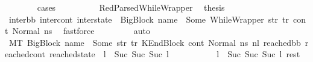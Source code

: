 \begin{isabellebody}
\ \ \ \ \ \ \isamarkupfalse%
\ cases\isanewline
\ \ \ \ \ \ \ \ \isamarkupfalse%
\ RedParsedWhileWrapper\ \isamarkupfalse%
\ {\isacharquery}{\kern0pt}thesis\ \isamarkupfalse%
\ {\isacartoucheopen}{\isacharparenleft}{\kern0pt}inter{\isacharunderscore}{\kern0pt}bb{}{\isacharcomma}{\kern0pt}\ inter{\isacharunderscore}{\kern0pt}cont{}{\isacharcomma}{\kern0pt}\ inter{\isacharunderscore}{\kern0pt}state{}{\isacharparenright}{\kern0pt}\ {\isacharequal}{\kern0pt}\ {\isacharparenleft}{\kern0pt}BigBlock\ name\ {\isacharbrackleft}{\kern0pt}{\isacharbrackright}{\kern0pt}\ {\isacharparenleft}{\kern0pt}Some\ {\isacharparenleft}{\kern0pt}WhileWrapper\ str{\isacharparenright}{\kern0pt}{\isacharparenright}{\kern0pt}\ tr{\isacharcomma}{\kern0pt}\ cont{}{\isacharcomma}{\kern0pt}\ Normal\ ns{}{\isacharparenright}{\kern0pt}{\isacartoucheclose}\ \isamarkupfalse%
\ fastforce\ \isanewline
\ \ \ \ \ \ \isamarkupfalse%
\ auto\isanewline
\ \ \ \ \ \ \isamarkupfalse%
\ {\isachardoublequoteopen}{\isacharparenleft}{\kern0pt}M{\isacharcomma}{\kern0pt}{\isasymLambda}{\isacharcomma}{\kern0pt}{\isasymGamma}{\isacharcomma}{\kern0pt}{\isasymOmega}{\isacharcomma}{\kern0pt}T\ {\isasymturnstile}{\isacharparenleft}{\kern0pt}{\isacharparenleft}{\kern0pt}BigBlock\ name\ {\isacharbrackleft}{\kern0pt}{\isacharbrackright}{\kern0pt}\ {\isacharparenleft}{\kern0pt}Some\ str{\isacharparenright}{\kern0pt}\ tr{\isacharparenright}{\kern0pt}{\isacharcomma}{\kern0pt}\ KEndBlock\ cont{}{\isacharcomma}{\kern0pt}\ Normal\ ns{}{\isacharparenright}{\kern0pt}\ {\isacharminus}{\kern0pt}n{\isasymlongrightarrow}{\isacharcircum}{\kern0pt}l{}\ {\isacharparenleft}{\kern0pt}reached{\isacharunderscore}{\kern0pt}bb{\isacharcomma}{\kern0pt}\ reached{\isacharunderscore}{\kern0pt}cont{\isacharcomma}{\kern0pt}\ reached{\isacharunderscore}{\kern0pt}state{\isacharparenright}{\kern0pt}{\isacharparenright}{\kern0pt}\ {\isasymand}\ {\isacharparenleft}{\kern0pt}l\ {\isacharequal}{\kern0pt}\ Suc\ {\isacharparenleft}{\kern0pt}Suc\ {\isacharparenleft}{\kern0pt}Suc\ l{}{\isacharparenright}{\kern0pt}{\isacharparenright}{\kern0pt}{\isacharparenright}{\kern0pt}{\isachardoublequoteclose}\ \isanewline
\ \ \ \ \ \ \ \ \isamarkupfalse%
\ {\isacartoucheopen}l\ {\isacharequal}{\kern0pt}\ Suc\ {\isacharparenleft}{\kern0pt}Suc\ {\isacharparenleft}{\kern0pt}Suc\ l{}{\isacharparenright}{\kern0pt}{\isacharparenright}{\kern0pt}{\isacartoucheclose}\ rest\ \isamarkupfalse%

\end{isabellebody}
